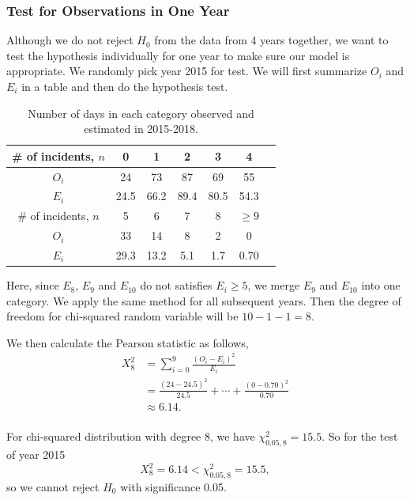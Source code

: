 \documentclass[11pt,a4paper,english]{article}
\begin{document}
\subsubsection{Test for Observations in One Year}
Although we do not reject $H_{0}$ from the data from 4 years together, we want to test the hypothesis individually for one year to make sure our model is appropriate. We randomly pick year 2015 for test. We will first summarize $O_{i}$ and $E_{i}$ in a table and then do the hypothesis test.


\begin{table}[htbp]
    \centering
	\begin{tabular}{c|cccccc}
		\hline
        \# of incidents, $n$ & 0 & 1 & 2 & 3 & 4  \\
		\hline
		$O_{i}$ & 24 & 73 & 87 & 69 & 55 \\
		\hline
		$E_{i}$ & 24.5 & 66.2 & 89.4 & 80.5 & 54.3 \\ 
		\hline
		\hline
		\# of incidents, $n$ & 5 & 6 & 7 & 8 & $\geq 9$  \\
		\hline
		$O_{i}$ & 33 & 14 & 8 & 2 & 0\\
		\hline
		$E_{i}$ & 29.3 & 13.2 & 5.1 & 1.7 & 0.70\\ 
		\hline 
    \end{tabular}
	\caption{Number of days in each category observed and estimated in 2015-2018.}
\end{table}

Here, since $E_{8}$, $E_{9}$ and $E_{10}$ do not satisfies $E_{i} \geq 5$, we merge $E_{9}$ and $E_{10}$ into one category. 
We apply the same method for all subsequent years. Then the degree of freedom for chi-squared random variable will be $10-1-1 = 8$.

We then calculate the Pearson statistic as follows,
\begin{align*}
	X_{8}^{2} &= \sum_{i = 0}^{9}\frac{(O_{i}-E_{i})^{2}}{E_{i}}\\
	&= \frac{(24-24.5)^{2}}{24.5}+\cdots+\frac{(0-0.70)^{2}}{0.70}\\
	&\approx 6.14.\\
\end{align*}

For chi-squared distribution with degree 8, we have $\chi_{0.05,8}^{2} = 15.5$. So for the test of year 2015
\begin{equation*}
	X_{8}^{2} = 6.14 < \chi_{0.05,8}^{2} = 15.5,
\end{equation*}
so we cannot reject $H_{0}$ with significance 0.05.
\end{document}
